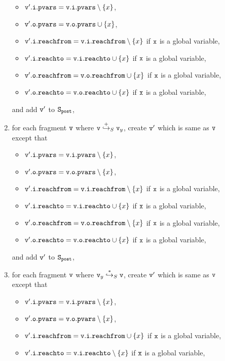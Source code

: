 \begin{description}
\begin{enumerate}
\begin{itemize}
\item $\mathtt{v}'.\mathtt{i}.\mathtt{pvars} = \mathtt{v}.\mathtt{i}.\mathtt{pvars} \setminus \left\{x\right\}$,
\item $\mathtt{v}'.\mathtt{o}.\mathtt{pvars} = \mathtt{v}.\mathtt{o}.\mathtt{pvars} \cup \left\{x\right\}$,
\item $\mathtt{v}'.\mathtt{i}.\mathtt{reachfrom} = \mathtt{v}.\mathtt{i}.\mathtt{reachfrom} \setminus \left\{x\right\}$ if $\tt x$ is a global variable,
\item $\mathtt{v}'.\mathtt{i}.\mathtt{reachto} = \mathtt{v}.\mathtt{i}.\mathtt{reachto} \cup \left\{x\right\}$ if $\tt x$ is a global variable,
 \item $\mathtt{v}'.\mathtt{o}.\mathtt{reachfrom} = \mathtt{v}.\mathtt{o}.\mathtt{reachfrom} \cup \left\{x\right\}$ if $\tt x$ is a global variable,
\item $\mathtt{v}'.\mathtt{o}.\mathtt{reachto} = \mathtt{v}.\mathtt{o}.\mathtt{reachto} \cup \left\{x\right\}$ if $\tt x$ is a global variable,
\end{itemize}
and add $\mathtt{v}'$ to $\tt S_{post}$,
\item for each fragment $\mathtt{v}$ where $\mathtt{v} \overset{+}\hookrightarrow_S \mathtt{v}_y$, create $\mathtt{v}'$ which is same as $\mathtt{v}$ except that
\begin{itemize}
\item $\mathtt{v}'.\mathtt{i}.\mathtt{pvars} = \mathtt{v}.\mathtt{i}.\mathtt{pvars} \setminus \left\{x\right\}$,
\item $\mathtt{v}'.\mathtt{o}.\mathtt{pvars} = \mathtt{v}.\mathtt{o}.\mathtt{pvars} \setminus \left\{x\right\}$,
\item $\mathtt{v}'.\mathtt{i}.\mathtt{reachfrom} = \mathtt{v}.\mathtt{i}.\mathtt{reachfrom} \setminus \left\{x\right\}$ if $\tt x$ is a global variable,
\item $\mathtt{v}'.\mathtt{i}.\mathtt{reachto} = \mathtt{v}.\mathtt{i}.\mathtt{reachto} \cup \left\{x\right\}$ if $\tt x$ is a global variable,
\item $\mathtt{v}'.\mathtt{o}.\mathtt{reachfrom} = \mathtt{v}.\mathtt{o}.\mathtt{reachfrom} \setminus \left\{x\right\}$ if $\tt x$ is a global variable,
\item $\mathtt{v}'.\mathtt{o}.\mathtt{reachto} = \mathtt{v}.\mathtt{o}.\mathtt{reachto} \cup \left\{x\right\}$ if $\tt x$ is a global variable,
\end{itemize}
and add $\mathtt{v}'$ to $\tt S_{post}$,
\item for each fragment $\mathtt{v}$ where $\mathtt{v}_y \overset{*}\hookrightarrow_S \mathtt{v}$, create $\mathtt{v}'$ which is same as $\mathtt{v}$ except that
\begin{itemize}
\item $\mathtt{v}'.\mathtt{i}.\mathtt{pvars} = \mathtt{v}.\mathtt{i}.\mathtt{pvars} \setminus \left\{x\right\}$,
\item $\mathtt{v}'.\mathtt{o}.\mathtt{pvars} = \mathtt{v}.\mathtt{o}.\mathtt{pvars} \setminus \left\{x\right\}$,
\item $\mathtt{v}'.\mathtt{i}.\mathtt{reachfrom} = \mathtt{v}.\mathtt{i}.\mathtt{reachfrom} \cup \left\{x\right\}$ if $\tt x$ is a global variable,
\item $\mathtt{v}'.\mathtt{i}.\mathtt{reachto} = \mathtt{v}.\mathtt{i}.\mathtt{reachto} \setminus \left\{x\right\}$ if $\tt x$ is a global variable,


\end{itemize}
\end{enumerate}
\end{description}
